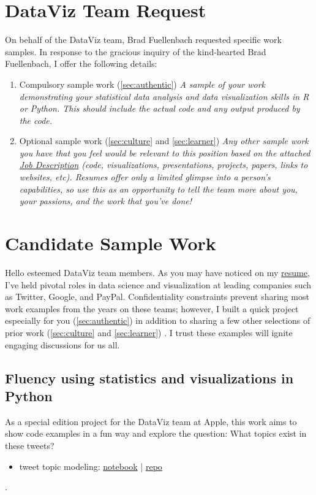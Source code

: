 \documentclass[11pt]{article}
\begin{document}
\newpage
\section{DataViz Team Request}
On behalf of the DataViz team, Brad Fuellenbach requested specific work samples. In response to the gracious inquiry of the kind-hearted Brad Fuellenbach, I offer the following details:
\begin{enumerate}
        \item Compulsory sample work (\autoref{sec:authentic}) \textit{\quote A sample of your work demonstrating your statistical data analysis and data visualization skills in R or Python. This should include the actual code and any output produced by the code.\endquote}       
         \item Optional sample work (\autoref{sec:culture} and \autoref{sec:learner}) \textit{\quote Any other sample work you have that you feel would be relevant to this position based on the attached \href{https://jobs.apple.com/en-us/details/200495248}{Job Description} (code, visualizations, presentations, projects, papers, links to websites, etc). Resumes offer only a limited glimpse into a person's capabilities, so use this as an opportunity to tell the team more about you, your passions, and the work that you've done!\endquote}
\end{enumerate}


\section{Candidate Sample Work}
Hello esteemed DataViz team members. As you may have noticed on my \href{https://github.com/blehman/resume/blob/main/Resume-blehman-visual-storyteller.pdf}{resume}, I've held pivotal roles in data science and visualization at leading companies such as Twitter, Google, and PayPal. Confidentiality constraints prevent sharing most work examples from the years on these teams; however, I built a quick project especially for you (\autoref{sec:authentic}) in addition to sharing a few other selections of prior work (\autoref{sec:culture} and \autoref{sec:learner}) . I trust these examples will ignite engaging discussions for us all. 


\subsection{Fluency using statistics and visualizations in Python}\label{sec:authentic}
As a special edition project for the DataViz team at Apple, this work aims to show code examples in a fun way and explore the question: What topics exist in these tweets?
\begin{itemize}
	\item tweet topic modeling: \href{https://github.com/blehman/code\_samples/blob/master/tweet\_topic\_modeling/tom_robbins\_whimsy.ipynb}{notebook} | \href{https://github.com/blehman/code\_samples/tree/master/tweet\_topic\_modeling}{repo}
\end{itemize}. 
\end{document}
